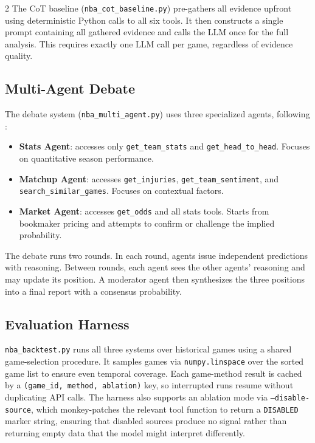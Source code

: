 \documentclass[11pt]{article}
\begin{document}
\begin{multicols}{2}
The CoT baseline (\texttt{nba\_cot\_baseline.py}) pre-gathers all evidence upfront using deterministic Python calls to all six tools. It then constructs a single prompt containing all gathered evidence and calls the LLM once for the full analysis. This requires exactly one LLM call per game, regardless of evidence quality.

\subsection{Multi-Agent Debate}

The debate system (\texttt{nba\_multi\_agent.py}) uses three specialized agents, following \citet{du2024}:

\begin{itemize}[leftmargin=*]
    \item \textbf{Stats Agent}: accesses only \texttt{get\_team\_stats} and \texttt{get\_head\_to\_head}. Focuses on quantitative season performance.
    \item \textbf{Matchup Agent}: accesses \texttt{get\_injuries}, \texttt{get\_team\_sentiment}, and \texttt{search\_similar\_games}. Focuses on contextual factors.
    \item \textbf{Market Agent}: accesses \texttt{get\_odds} and all stats tools. Starts from bookmaker pricing and attempts to confirm or challenge the implied probability.
\end{itemize}

The debate runs two rounds. In each round, agents issue independent predictions with reasoning. Between rounds, each agent sees the other agents' reasoning and may update its position. A moderator agent then synthesizes the three positions into a final report with a consensus probability.

\subsection{Evaluation Harness}

\texttt{nba\_backtest.py} runs all three systems over historical games using a shared game-selection procedure. It samples games via \texttt{numpy.linspace} over the sorted game list to ensure even temporal coverage. Each game-method result is cached by a \texttt{(game\_id, method, ablation)} key, so interrupted runs resume without duplicating API calls. The harness also supports an ablation mode via \texttt{--disable-source}, which monkey-patches the relevant tool function to return a \texttt{DISABLED} marker string, ensuring that disabled sources produce no signal rather than returning empty data that the model might interpret differently.


\end{multicols}
\end{document}
